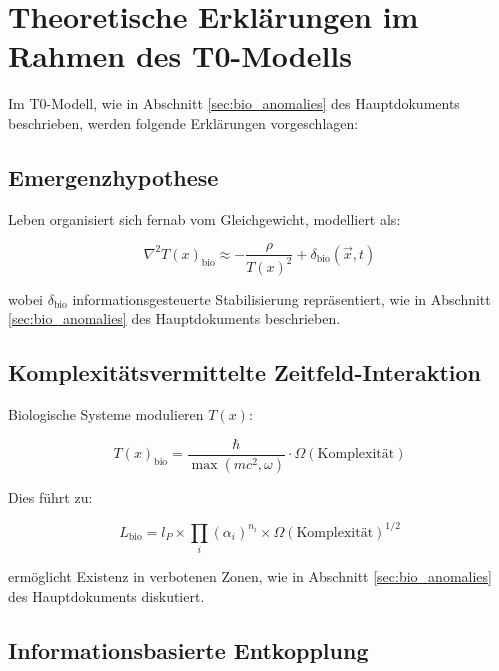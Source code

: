 \documentclass[12pt,a4paper]{article}
\newcommand{\Tfield}{T(x)}
\begin{document}
	\section{Theoretische Erklärungen im Rahmen des T0-Modells}
	\label{sec:theoretische_erklaerungen}
	
	Im T0-Modell, wie in Abschnitt \ref{sec:bio_anomalies} des Hauptdokuments beschrieben, werden folgende Erklärungen vorgeschlagen:
	
	\subsection{Emergenzhypothese}
	\label{subsec:emergenzhypothese}
	
	Leben organisiert sich fernab vom Gleichgewicht, modelliert als:
	
	\begin{equation}
		\nabla^2\Tfield_{\text{bio}} \approx -\frac{\rho}{\Tfield^2} + \delta_{\text{bio}}(\vec{x}, t)
	\end{equation}
	
	wobei \(\delta_{\text{bio}}\) informationsgesteuerte Stabilisierung repräsentiert, wie in Abschnitt \ref{sec:bio_anomalies} des Hauptdokuments beschrieben.
	
	\subsection{Komplexitätsvermittelte Zeitfeld-Interaktion}
	\label{subsec:komplexitaet_interaktion}
	
	Biologische Systeme modulieren \(\Tfield\):
	
	\begin{equation}
		\Tfield_{\text{bio}} = \frac{\hbar}{\max(mc^2, \omega)} \cdot \Omega(\text{Komplexität})
	\end{equation}
	
	Dies führt zu:
	
	\begin{equation}
		L_{\text{bio}} = l_P \times \prod_{i} (\alpha_i)^{n_i} \times \Omega(\text{Komplexität})^{1/2}
	\end{equation}
	
	ermöglicht Existenz in verbotenen Zonen, wie in Abschnitt \ref{sec:bio_anomalies} des Hauptdokuments diskutiert.
	
	\subsection{Informationsbasierte Entkopplung}
	\label{subsec:informationsbasierte_entkopplung}
	
\end{document}
